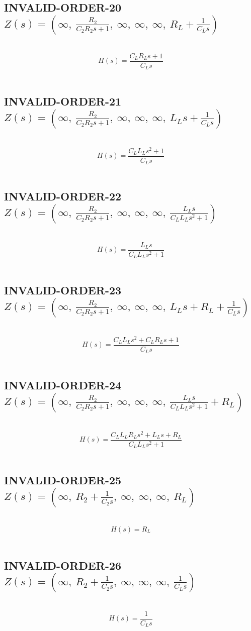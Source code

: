 \documentclass{article}
\begin{document}
\subsection{INVALID-ORDER-20 $Z(s) = \left( \infty, \  \frac{R_{2}}{C_{2} R_{2} s + 1}, \  \infty, \  \infty, \  \infty, \  R_{L} + \frac{1}{C_{L} s}\right)$ } \ 
\textbf{\[H(s) = \frac{C_{L} R_{L} s + 1}{C_{L} s}\] } \ 
\subsection{INVALID-ORDER-21 $Z(s) = \left( \infty, \  \frac{R_{2}}{C_{2} R_{2} s + 1}, \  \infty, \  \infty, \  \infty, \  L_{L} s + \frac{1}{C_{L} s}\right)$ } \ 
\textbf{\[H(s) = \frac{C_{L} L_{L} s^{2} + 1}{C_{L} s}\] } \ 
\subsection{INVALID-ORDER-22 $Z(s) = \left( \infty, \  \frac{R_{2}}{C_{2} R_{2} s + 1}, \  \infty, \  \infty, \  \infty, \  \frac{L_{L} s}{C_{L} L_{L} s^{2} + 1}\right)$ } \ 
\textbf{\[H(s) = \frac{L_{L} s}{C_{L} L_{L} s^{2} + 1}\] } \ 
\subsection{INVALID-ORDER-23 $Z(s) = \left( \infty, \  \frac{R_{2}}{C_{2} R_{2} s + 1}, \  \infty, \  \infty, \  \infty, \  L_{L} s + R_{L} + \frac{1}{C_{L} s}\right)$ } \ 
\textbf{\[H(s) = \frac{C_{L} L_{L} s^{2} + C_{L} R_{L} s + 1}{C_{L} s}\] } \ 
\subsection{INVALID-ORDER-24 $Z(s) = \left( \infty, \  \frac{R_{2}}{C_{2} R_{2} s + 1}, \  \infty, \  \infty, \  \infty, \  \frac{L_{L} s}{C_{L} L_{L} s^{2} + 1} + R_{L}\right)$ } \ 
\textbf{\[H(s) = \frac{C_{L} L_{L} R_{L} s^{2} + L_{L} s + R_{L}}{C_{L} L_{L} s^{2} + 1}\] } \ 
\subsection{INVALID-ORDER-25 $Z(s) = \left( \infty, \  R_{2} + \frac{1}{C_{2} s}, \  \infty, \  \infty, \  \infty, \  R_{L}\right)$ } \ 
\textbf{\[H(s) = R_{L}\] } \ 
\subsection{INVALID-ORDER-26 $Z(s) = \left( \infty, \  R_{2} + \frac{1}{C_{2} s}, \  \infty, \  \infty, \  \infty, \  \frac{1}{C_{L} s}\right)$ } \ 
\textbf{\[H(s) = \frac{1}{C_{L} s}\] } \ 
\end{document}
